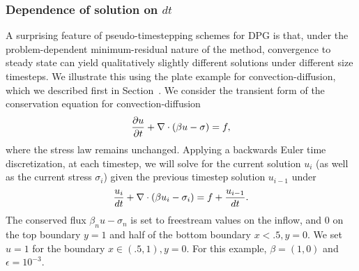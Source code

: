\subsubsection{Dependence of solution on $dt$}

A surprising feature of pseudo-timestepping schemes for DPG is that, under the problem-dependent minimum-residual nature of the method, convergence to steady state can yield qualitatively slightly different solutions under different size timesteps.  We illustrate this using the plate example for convection-diffusion, which we described first in Section~.  We consider the transient form of the conservation equation for convection-diffusion
\[
\pd{u}{t} + \div \LRp{\beta u - \sigma} = f, 
\]
where the stress law remains unchanged.  Applying a backwards Euler time discretization, at each timestep, we will solve for the current solution $u_i$ (as well as the current stress $\sigma_i$) given the previous timestep solution $u_{i-1}$ under
\[
\frac{u_i}{dt} + \div \LRp{\beta u_i - \sigma_i} = f + \frac{u_{i-1}}{dt}.
\]
The conserved flux $\beta_n u - \sigma_n$ is set to freestream values on the inflow, and 0 on the top boundary $y = 1$ and half of the bottom boundary $x < .5, y = 0$.  We set $u = 1$ for the boundary $x \in (.5,1), y = 0$. For this example, $\beta = (1,0)$ and $\epsilon = 10^{-3}$.  
